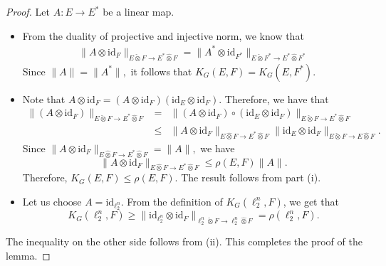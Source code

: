 \documentclass[a4paper,oneside,11pt, reqno]{amsart}
\numberwithin{equation}{section}
\theoremstyle{plain}
\begin{document}
\begin{proof} Let $A:E\to E^*$ be a linear map.
	\begin{itemize}
		\item[(i)] From the duality of projective and injective norm, we know that 
		\begin{eqnarray*}
		\|A\otimes \text{id}_F\|_{E\check{\otimes}F\to E^*\hat{\otimes}F} = \|A^*\otimes \text{id}_{F^*}\|_{E\check{\otimes}F^*\to E^*\hat{\otimes}F^*}
		\end{eqnarray*}
Since $\|A\|=\|A^*\|,$ it follows that $K_G(E,F)=K_G(E,F^*).$
		
\item[(ii)] Note that $A\otimes \text{id}_F=(A\otimes\text{id}_F)(\text{id}_{E}\otimes\text{id}_F).$ Therefore, we have that 
\begin{eqnarray*}
\|(A\otimes \text{id}_F)\|_{E\check{\otimes}F\to E^*\hat{\otimes}F} &=& \|(A\otimes \text{id}_F)\circ (\text{id}_E\otimes\text{id}_F)\|_{E\check{\otimes}F\to E^*\hat{\otimes}F}\\
&\leqslant & \|A\otimes\text{id}_F\|_{E\hat{\otimes}F\to E^*\hat{\otimes}F}\|\text{id}_{E}\otimes\text{id}_F\|_{E\check{\otimes}F \to E\hat{\otimes}F}.
\end{eqnarray*}
Since $ \|A\otimes\text{id}_F\|_{E\hat{\otimes}F\to E^*\hat{\otimes}F}=\|A\|,$ we have 
\[\|A\otimes\text{id}_F\|_{E\hat{\otimes}F\to E^*\hat{\otimes}F}\leqslant \rho(E,F) \|A\|.\] Therefore, $K_G(E,F)\leqslant \rho(E,F).$ The result follows from part (i).
\item[(iii)] Let us choose $A=\text{id}_{\ell_2^n}.$ From the definition of $K_G(\ell_2^n,F)$,  we get that 
\[K_G(\ell_2^n,F)\geqslant \|\text{id}_{\ell_2^n}\otimes\text{id}_F\|_{\ell_2^n\check{\otimes}F\to \ell_2^n\hat{\otimes}F}=\rho(\ell_2^n,F).\]
\end{itemize}
The  inequality on the other side  follows from (ii). 
 This completes the proof of the lemma.
\end{proof}
\end{document}
